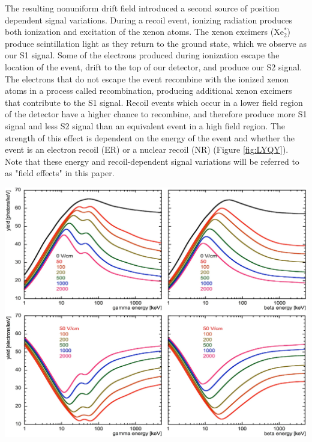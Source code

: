 The resulting nonuniform drift field introduced a second source of position dependent signal variations.  During a recoil event, ionizing radiation produces both ionization and excitation of the xenon atoms.  The xenon excimers (Xe$_2^*$) produce scintillation light as they return to the ground state, which we observe as our S1 signal. Some of the electrons produced during ionization escape the location of the event, drift to the top of our detector, and produce our S2 signal.  The electrons that do not escape the event recombine with the ionized xenon atoms in a process called recombination, producing additional xenon excimers that contribute to the S1 signal.  Recoil events which occur in a lower field region of the detector have a higher chance to recombine, and therefore produce more S1 signal and less S2 signal than an equivalent event in a high field region.  The strength of this effect is dependent on the energy of the event and whether the event is an electron recoil (ER) or a nuclear recoil (NR) (Figure \ref{fig:LYQY}).  Note that these energy and recoil-dependent signal variations will be referred to as "field effects" in this paper.  

\begin{center}
\includegraphics[scale=0.25]{figures/Recomb.png}
 \label{fig:LYQY}
\end{center}
